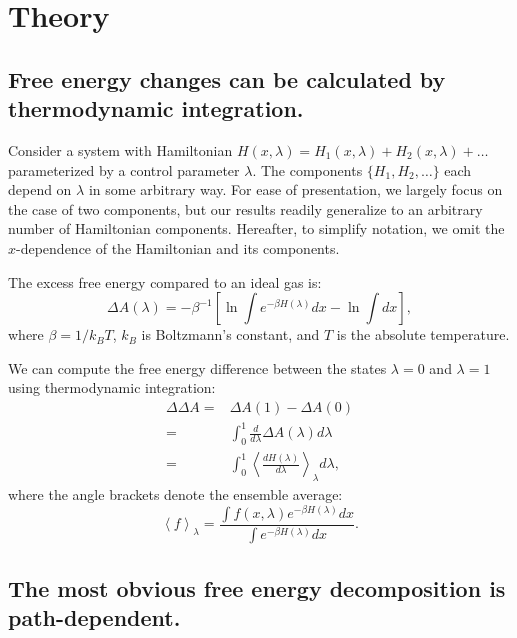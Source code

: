\documentclass{article}
\begin{document}
\section{Theory}

\subsection{Free energy changes can be calculated by thermodynamic integration.}

Consider a system with Hamiltonian $H(x, \lambda) = H_1(x, \lambda) + H_2(x, \lambda) + \ldots$ parameterized by a control parameter $\lambda$. The components $\{H_1, H_2, \ldots\}$ each depend on $\lambda$ in some arbitrary way. For ease of presentation, we largely focus on the case of two components, but our results readily generalize to an arbitrary number of Hamiltonian components. Hereafter, to simplify notation, we omit the $x$-dependence of the Hamiltonian and its components.

The excess free energy compared to an ideal gas is:
\begin{equation}\label{eq:dA}
\Delta A(\lambda) = -\beta^{-1} \left[ 
	\ln \int e^{-\beta H(\lambda)} dx - 
	\ln \int dx
\right],
\end{equation}
where $\beta=1/k_BT$, $k_B$ is Boltzmann's constant, and $T$ is the absolute temperature.

We can compute the free energy difference between the states $\lambda=0$ and $\lambda=1$ using thermodynamic integration:
\begin{align}
\Delta\Delta A =& \Delta A(1) - \Delta A(0) \nonumber\\
               =& \int_0^1 \frac{d}{d\lambda} \Delta A(\lambda) d\lambda \nonumber\\
               =& \int_0^1 \left\langle \frac{dH(\lambda)}{d\lambda}\right\rangle_\lambda 
                d\lambda \label{eq:TI},
\end{align}
where the angle brackets denote the ensemble average:
\begin{equation}
\left\langle f \right\rangle_\lambda = \frac
	{\int f(x, \lambda) e^{-\beta H(\lambda)} dx}
    {\int e^{-\beta H(\lambda)} dx}.
\end{equation}




\subsection{The most obvious free energy decomposition is path-dependent.}
\end{document}
